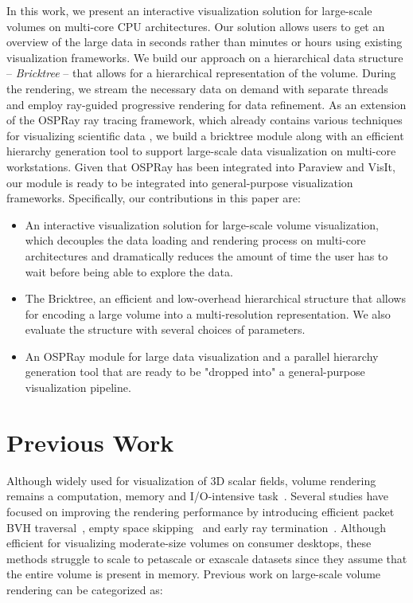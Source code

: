 In this work, we present an interactive visualization solution for large-scale
volumes on multi-core CPU architectures. Our solution allows users to get an overview of the large
data in seconds rather than minutes or hours using existing visualization frameworks. 
We build our approach on a hierarchical data structure -- \textit{Bricktree} -- that allows
for a hierarchical representation of the volume. During the rendering, we stream the
necessary data on demand with separate threads and employ ray-guided progressive
rendering for data refinement. As an extension of the OSPRay ray tracing 
framework, which already contains various techniques for visualizing scientific data \cite{wald2017ospray,wang2018cpu}, we build a bricktree
module along with an efficient hierarchy generation tool to support large-scale data
visualization on multi-core workstations. Given that OSPRay has been integrated into
Paraview and VisIt, our module is ready to be integrated into general-purpose
visualization frameworks. Specifically, our contributions in this paper are:

\begin{itemize}
\item An interactive visualization solution for large-scale volume
visualization, which decouples the data loading and rendering process 
on multi-core architectures and dramatically reduces the amount of time the user has to
wait before being able to explore the data. 
\item The Bricktree, an efficient and low-overhead hierarchical structure that
allows for encoding a large volume into a multi-resolution representation.
We also evaluate the structure with several choices of parameters. 
\item An OSPRay module for large data visualization
and a parallel hierarchy generation tool that are ready to be 
"dropped into" a general-purpose visualization pipeline.  
\end{itemize}



\section{Previous Work}

Although widely used for visualization of 3D scalar fields, volume rendering
remains a computation, memory and I/O-intensive task~\cite{wu2018visit}. 
Several studies have focused on improving the rendering performance by
introducing efficient packet BVH traversal~\cite{knoll2011full,wald2017ospray}, 
empty space skipping~\cite{hadwiger2018sparseleap} and
early ray termination~\cite{levoy1990efficient,kruger2003acceleration}.
Although efficient for visualizing moderate-size volumes on consumer desktops, 
these methods struggle to scale to petascale or exascale datasets since they assume that the entire volume is present in memory. 
Previous work on large-scale volume rendering
can be categorized as: 

